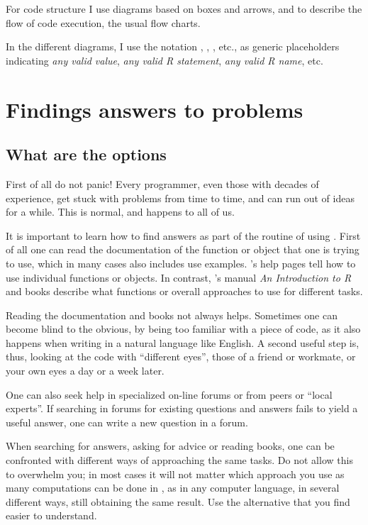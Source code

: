 \documentclass[krantz2]{krantz}\usepackage{knitr}
\begin{document}
For code structure I use diagrams based on boxes and arrows, and to describe the flow of code execution, the usual flow charts.

In the different diagrams, I use the notation \textcolor{blue}{},  \textcolor{blue}{}, \textcolor{blue}{}, etc., as generic placeholders indicating \emph{any valid value}, \emph{any valid R statement}, \emph{any valid R name}, etc.

\section{Findings answers to problems}

\subsection{What are the options}

First of all do not panic! Every programmer, even those with decades of experience, get stuck with problems from time to time, and can run out of ideas for a while. This is normal, and happens to all of us.

It is important to learn how to find answers as part of the routine of using \Rlang. First of all one can read the documentation of the function or object that one is trying to use, which in many cases also includes use examples. \Rlang's help pages tell how to use individual functions or objects. In contrast, \Rlang's manual \emph{An Introduction to R} and books describe what functions or overall approaches to use for different tasks.

Reading the documentation and books not always helps. Sometimes one can become blind to the obvious, by being too familiar with a piece of code, as it also happens when writing in a natural language like English. A second useful step is, thus, looking at the code with ``different eyes'', those of a friend or workmate, or your own eyes a day or a week later.

One can also seek help in specialized on-line forums or from peers or ``local experts''. If searching in forums for existing questions and answers fails to yield a useful answer, one can write a new question in a forum.

When searching for answers, asking for advice or reading books, one can be confronted with different ways of approaching the same tasks. Do not allow this to overwhelm you; in most cases it will not matter which approach you use as many computations can be done in \Rpgrm, as in any computer language, in several different ways, still obtaining the same result. Use the alternative that you find easier to understand.
\end{document}
